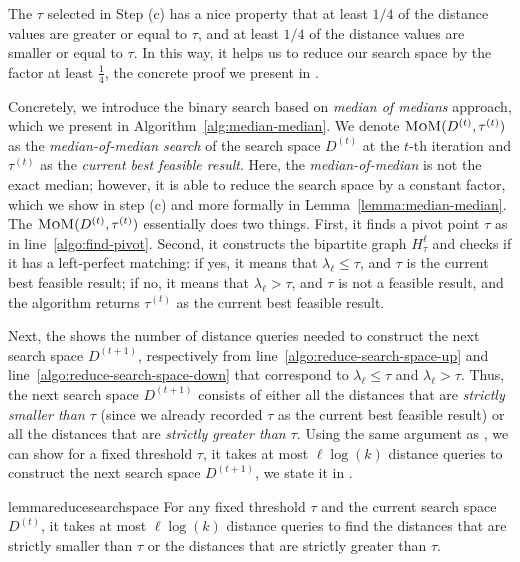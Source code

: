 \documentclass{article}
\begin{document}
The $\tau$ selected in Step (c) has a nice property that at least $1/4$ of the distance values are greater or equal to $\tau$, and at least $1/4$ of the distance values are smaller or equal to $\tau$. In this way, it helps us to reduce our search space by the factor at least $\frac{1}{4}$,
the concrete proof we present in . 

\smallskip 

Concretely, we introduce the {binary search} based on \emph{median of medians} approach, which we present in Algorithm~\ref{alg:median-median}.
We denote $\textsc{MoM}(D^{(t)}, \tau^{(t)})$ as the \emph{median-of-median search} of the search space $D^{(t)}$ at the $t$-th iteration and $\tau^{(t)}$ as the \emph{current best feasible result}. 
Here, the \emph{median-of-median} is not the exact median; however, it is able to reduce the search space by a constant factor, which we show in step (c) and more formally in Lemma~\ref{lemma:median-median}.
The $\textsc{MoM}(D^{(t)}, \tau^{(t)})$ essentially does two things. First, it finds a pivot point $\tau$ as in line~\ref{algo:find-pivot}. Second, it constructs the bipartite graph $H^{\ell}_{\tau}$ and checks if it has a left-perfect matching: if yes, it means that $\lambda_{\ell} \leq \tau$, and $\tau$ is the current best feasible result; if no, it means that $\lambda_{\ell} > \tau$, and $\tau$ is not a feasible result, and the algorithm returns $\tau^{(t)}$ as the current best feasible result.

Next, the  shows the number of distance queries needed to construct the next search space $D^{(t+1)}$, respectively from line~\ref{algo:reduce-search-space-up} and line~\ref{algo:reduce-search-space-down} that correspond to $\lambda_{\ell} \leq \tau$ and $\lambda_{\ell} > \tau$.
Thus, the next search space $D^{(t+1)}$ consists of either all the distances that are \emph{strictly smaller than $\tau$} (since we already recorded $\tau$ as the current best feasible result) or all the distances that are \emph{strictly greater than $\tau$}. 
Using the same argument as , we can show for a fixed threshold $\tau$, it takes at most $\ell \log(k)$ distance queries to construct the next search space $D^{(t+1)}$, we state it in . 
\begin{restatable}{lemma}{reducesearchspace}
    \label{lemma:reduce-search-space}
    For any fixed threshold $\tau$ and the current search space $D^{(t)}$, it takes at most $\ell \log(k)$ distance queries to find the distances that are strictly smaller than $\tau$ or the distances that are strictly greater than $\tau$.
\end{restatable}
\end{document}

